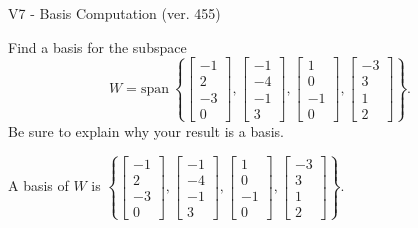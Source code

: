 \begin{exercise}
  \begin{exerciseTitle}V7 - Basis Computation (ver. 455)\end{exerciseTitle}
  \begin{exerciseStatement}
    Find a basis for the subspace 
\[W=\mathrm{span}\ \left\{\left[\begin{array}{r}
-1 \\
2 \\
-3 \\
0
\end{array}\right] , \left[\begin{array}{r}
-1 \\
-4 \\
-1 \\
3
\end{array}\right] , \left[\begin{array}{r}
1 \\
0 \\
-1 \\
0
\end{array}\right] , \left[\begin{array}{r}
-3 \\
3 \\
1 \\
2
\end{array}\right]\right\}.\]
 Be sure to explain why your result is a basis.


  \end{exerciseStatement}
  \begin{exerciseAnswer}
   A basis of \(W\) is  \(\left\{\left[\begin{array}{r}
-1 \\
2 \\
-3 \\
0
\end{array}\right] , \left[\begin{array}{r}
-1 \\
-4 \\
-1 \\
3
\end{array}\right] , \left[\begin{array}{r}
1 \\
0 \\
-1 \\
0
\end{array}\right] , \left[\begin{array}{r}
-3 \\
3 \\
1 \\
2
\end{array}\right]\right\}\).
  


  \end{exerciseAnswer}
\end{exercise}